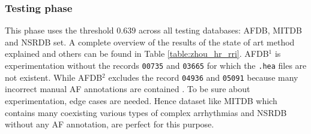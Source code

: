 \subsubsection{Testing phase}
This phase uses the threshold $0.639$ across all testing databases: AFDB, MITDB\cite{mitdb} and NSRDB\cite{nsrdb} set. A complete overview of the results of the state of art method explained and others can be found in Table \ref{table:zhou_hr_rri}.
AFDB$^1$ is experimentation without the records \verb|00735| and \verb|03665| for which the \verb|.hea| files are not existent. While AFDB$^2$ excludes the record \verb|04936| and \verb|05091| because many incorrect manual AF annotations are contained \cite{lee2013}. 
To be sure about experimentation, edge cases are needed. Hence dataset like MITDB which contains many coexisting various types of complex arrhythmias and NSRDB without any AF annotation, are perfect for this purpose.

